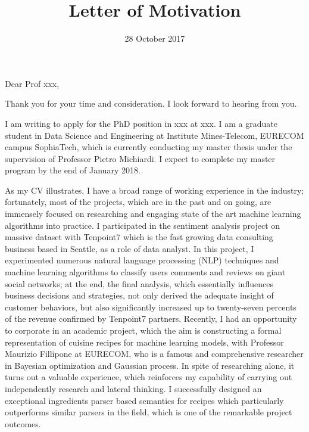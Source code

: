 \documentclass[11pt,a4paper,roman]{moderncv}        %
\title{Letter of Motivation}                               %
\begin{document}
\date{28 October 2017}
\opening{Dear Prof xxx,}
\closing{Thank you for your time and consideration.  I look forward to hearing from you.}
\makelettertitle

I am writing to apply for the PhD position in {xxx} at {xxx}. I am a graduate student in Data Science and Engineering at Institute Mines-Telecom, EURECOM campus SophiaTech, which is currently conducting my master thesis under the supervision of Professor Pietro Michiardi. I expect to complete my master program by the end of January 2018. 

As my CV illustrates, I have a broad range of working experience in the industry; fortunately, most of the projects, which are in the past and on going, are immensely focused on researching and engaging state of the art machine learning algorithms into practice. I participated in the sentiment analysis project on massive dataset with Tenpoint7 which is the fast growing data consulting business based in Seattle, as a role of data analyst. In this project, I experimented numerous natural language processing (NLP) techniques and machine learning algorithms to classify users comments and reviews on giant social networks; at the end, the final analysis, which essentially influences business decisions and strategies, not only derived the adequate insight of customer behaviors, but also significantly increased up to twenty-seven percents of the revenue confirmed by Tenpoint7 partners. Recently, I had an opportunity to corporate in an academic project, which the aim is constructing a formal representation of cuisine recipes for machine learning models, with Professor Maurizio Fillipone at EURECOM, who is a famous and comprehensive researcher in Bayesian optimization and Gaussian process. In spite of researching alone, it turns out a valuable experience, which reinforces my capability of carrying out independently research and lateral thinking. I successfully designed an exceptional ingredients parser based semantics for recipes which particularly outperforms similar parsers in the field, which is one of the remarkable project outcomes.
\end{document}
